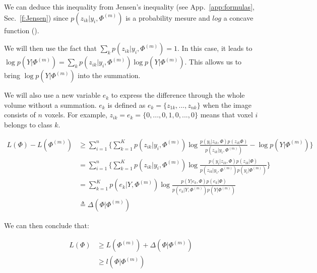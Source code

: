 We can deduce this inequality from Jensen's inequality (see App.~\ref{app:formulas}, Sec.~\ref{f:Jensen}) since  $p(z_{ik}|y_i,\Phi^{(m)})$ is a probability mesure and $log$ a concave function (\cite{5}). %

\par
We will then use the fact that  $\sum_k p(z_{ik}|y_i,\Phi^{(m)})=1$. In this case, it leads to $\operatorname*{log} p(Y|\Phi^{(m)})=\sum_k p(z_{ik}|y_i,\Phi^{(m)})\operatorname*{log} p(Y|\Phi^{(m)})$. This allows us to bring $\operatorname*{log} p(Y|\Phi^{(m)})$ into the summation. 
\par
We will also use a new variable $e_k$ to express the difference through the whole volume without a summation. $e_k$ is defined as $e_k=\{z_{1k}, ..., z_{nk}\}$ when the image consists of $n$ voxels. For example, $z_{ik}=e_k=\{0,...,0,1,0,...,0\}$ means that voxel $i$ belongs to class $k$.

  \begin{align*}
  L(\Phi)-L(\Phi^{(m)}) &\geq \sum_{i=1}^n\{\sum_{k=1}^K p(z_{ik}|y_i,\Phi^{(m)})\operatorname*{log} \frac{p(y_i|z_{ik},\Phi)p(z_{ik}\Phi)}{p(z_{ik}|y_i,\Phi^{(m)})}-\operatorname*{log} p(Y|\Phi^{(m)})\} \\
                    &=\sum_{i=1}^n\{\sum_{k=1}^K   p(z_{ik}|y_i,\Phi^{(m)})\operatorname*{log} \frac{p(y_i|z_{ik},\Phi)p(z_{ik}|\Phi)}{p(z_{ik}|y_i,\Phi^{(m)})p(y_i|\Phi^{(m)})}\}\\
                    &=\sum_{k=1}^K   p(e_{k}|Y,\Phi^{(m)})\operatorname*{log} \frac{p(Y|e_{k},\Phi)p(e_{k}|\Phi)}{p(e_{k}|Y,\Phi^{(m)})p(Y|\Phi^{(m)})}\\
                    &\triangleq \Delta(\Phi|\Phi^{(m)})
  \end{align*}

We can then conclude that:

  \begin{align*}
  L(\Phi) &\geq L(\Phi^{(m)}) + \Delta(\Phi|\Phi^{(m)})\\
          &\geq l(\Phi|\Phi^{(m)})
  \end{align*}


